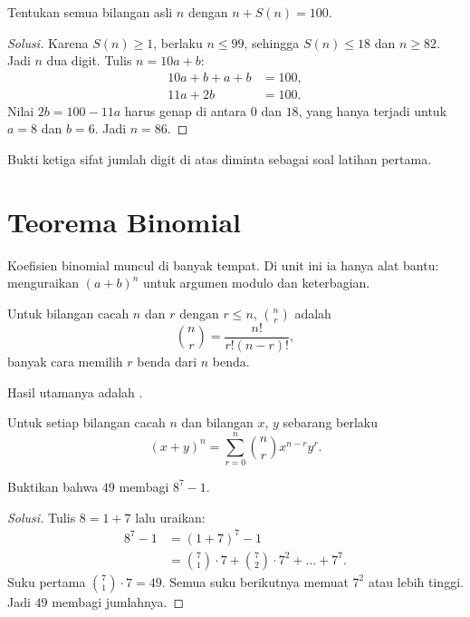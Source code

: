 \documentclass[12pt]{scrartcl}
\begin{document}
\begin{example}
Tentukan semua bilangan asli $n$ dengan $n + S(n) = 100$.
\end{example}
\begin{proof}[Solusi]
Karena $S(n) \ge 1$, berlaku $n \le 99$, sehingga $S(n) \le 18$ dan $n \ge 82$.
Jadi $n$ dua digit. Tulis $n = 10a + b$:
\begin{align*}
10a + b + a + b &= 100, \\
11a + 2b &= 100.
\end{align*}
Nilai $2b = 100 - 11a$ harus genap di antara $0$ dan $18$,
yang hanya terjadi untuk $a = 8$ dan $b = 6$.
Jadi $n = 86$.
\end{proof}

\begin{remark}
Bukti ketiga sifat jumlah digit di atas diminta sebagai soal latihan pertama.
\end{remark}

\section{Teorema Binomial}

Koefisien binomial muncul di banyak tempat.
Di unit ini ia hanya alat bantu:
menguraikan $(a + b)^n$ untuk argumen modulo dan keterbagian.

\begin{definition}
Untuk bilangan cacah $n$ dan $r$ dengan $r \le n$,
 $\binom{n}{r}$ adalah
\[ \binom{n}{r} = \frac{n!}{r!(n-r)!}, \]
banyak cara memilih $r$ benda dari $n$ benda.
\end{definition}

Hasil utamanya adalah .

\begin{theorem}
Untuk setiap bilangan cacah $n$ dan bilangan $x$, $y$ sebarang berlaku
\[ (x + y)^n = \sum_{r=0}^{n} \binom{n}{r} x^{n-r} y^r. \]
\end{theorem}

\begin{example}
Buktikan bahwa $49$ membagi $8^7 - 1$.
\end{example}
\begin{proof}[Solusi]
Tulis $8 = 1 + 7$ lalu uraikan:
\begin{align*}
8^7 - 1 &= (1 + 7)^7 - 1 \\
&= \binom{7}{1} \cdot 7 + \binom{7}{2} \cdot 7^2 + \dots + 7^7.
\end{align*}
Suku pertama $\binom{7}{1} \cdot 7 = 49$.
Semua suku berikutnya memuat $7^2$ atau lebih tinggi.
Jadi $49$ membagi jumlahnya.
\end{proof}
\end{document}
